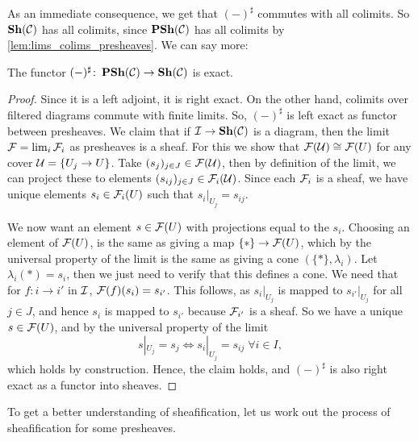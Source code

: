 \documentclass{article}
\begin{document}
As an immediate consequence, we get that $(-)^\sharp$
commutes with all colimits. So $\operatorname{\mathbf{Sh}}(\mathcal{C})$ has all colimits,
since $\operatorname{\mathbf{PSh}}(\mathcal{C})$ has all colimits by \cref{lem:lims_colims_presheaves}.
We can say more:
\begin{prop}
    \label{prop:sheafification_exact}
    The functor $(-)^\sharp\colon \operatorname{\mathbf{PSh}}(\mathcal{C}) \to \operatorname{\mathbf{Sh}}(\mathcal{C})$ is exact.
\end{prop}
\begin{proof}
    Since it is a left adjoint, it is right exact. On the other hand,
    colimits over filtered diagrams commute with finite limits.
    So, $(-)^\sharp$ is left exact as functor between presheaves.
    We claim that if $\mathcal{I} \to \operatorname{\mathbf{Sh}}(\mathcal{C})$ is a diagram, then
    the limit $\mathcal{F} = \lim_i \mathcal{F}_i$ as presheaves is a sheaf.
    For this we show that $\mathcal{F}(\mathcal{U}) \cong \mathcal{F}(U)$ for any cover $\mathcal{U} = \{U_j \to U\}$.
    Take $(s_j)_{j\in J} \in \mathcal{F}(\mathcal{U})$, then by definition of the
    limit, we can project these to elements $(s_{ij})_{j \in J} \in \mathcal{F}_i(\mathcal{U})$.
    Since each $\mathcal{F}_i$ is a sheaf, we have unique elements $s_i \in \mathcal{F}_i(U)$
    such that $s_i |_{U_j} = s_{ij}$.

    We now want an element $s\in \mathcal{F}(U)$ with projections equal to the $s_i$.
    Choosing an element of $\mathcal{F}(U)$, is the same as giving a map $\{*\} \to \mathcal{F}(U)$,
    which by the universal property of the limit is the same as giving a cone
    $(\{*\}, \lambda_i)$. Let $\lambda_i(*) = s_i$, then we just need to verify
    that this defines a cone.
    We need that for $f\colon i\to i'$ in $\mathcal{I}$,
    $\mathcal{F}(f)(s_i) = s_{i'}$. This follows, as $s_i|_{U_j}$ is mapped to $s_{i'}|_{U_j}$
    for all $j\in J$, and hence $s_i$ is mapped to $s_{i'}$ because
    $\mathcal{F}_{i'}$ is a sheaf. So we have a unique $s\in \mathcal{F}(U)$,
    and by the universal property of the limit
    \begin{equation*}
        s|_{U_j} = s_j \iff s_i|_{U_j} = s_{ij}\; \forall i\in I,
    \end{equation*}
    which holds by construction.
    Hence, the claim holds, and $(-)^\sharp$ is also right exact as a functor
    into sheaves.
\end{proof}
To get a better understanding of sheafification, let us work out
the process of sheafification for some presheaves.
\end{document}

